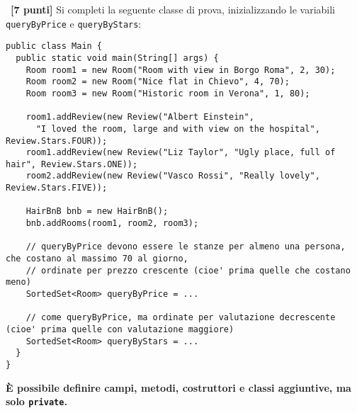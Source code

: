 \documentclass{article}[10pt]
\newcounter{esnu}
\newenvironment{esercizio}{\medskip \noindent {\bf Esercizio\addtocounter{esnu}{1} \arabic{esnu}}}{}
\begin{document}
\begin{esercizio}~\textbf{[7 punti]}
Si completi la seguente classe di prova, inizializzando le variabili
\texttt{queryByPrice} e \texttt{queryByStars}:
%
\begin{lstlisting}
public class Main {
  public static void main(String[] args) {
    Room room1 = new Room("Room with view in Borgo Roma", 2, 30);
    Room room2 = new Room("Nice flat in Chievo", 4, 70);
    Room room3 = new Room("Historic room in Verona", 1, 80);

    room1.addReview(new Review("Albert Einstein",
      "I loved the room, large and with view on the hospital", Review.Stars.FOUR));
    room1.addReview(new Review("Liz Taylor", "Ugly place, full of hair", Review.Stars.ONE));
    room2.addReview(new Review("Vasco Rossi", "Really lovely", Review.Stars.FIVE));

    HairBnB bnb = new HairBnB();
    bnb.addRooms(room1, room2, room3);

    // queryByPrice devono essere le stanze per almeno una persona, che costano al massimo 70 al giorno,
    // ordinate per prezzo crescente (cioe' prima quelle che costano meno)
    SortedSet<Room> queryByPrice = ...

    // come queryByPrice, ma ordinate per valutazione decrescente (cioe' prima quelle con valutazione maggiore)
    SortedSet<Room> queryByStars = ...
  }
}
\end{lstlisting}
\end{esercizio}

\begin{center}
\textbf{\`E possibile definire campi, metodi, costruttori e classi aggiuntive, ma solo \texttt{private}.}
\end{center}
\end{document}
